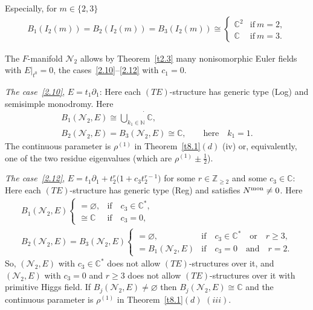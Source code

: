 \documentclass[pdftex]{sigma}%
\numberwithin{equation}{section}
\numberwithin{figure}{section}
\newcommand{\N}{{\mathbb N}}
\newcommand{\Z}{{\mathbb Z}}
\newcommand{\C}{{\mathbb C}}
\newcommand{\NN}{{\mathcal N}}
\newcommand{\paa}{\partial}
\begin{document}
\begin{Remarks}
\begin{enumerate}
Especially, for $m\in\{2,3\}$
\begin{gather*}%
B_1(I_2(m))=B_2(I_2(m))=B_3(I_2(m))\cong
\begin{cases} \C^2&\text{if}\ m=2,\\
\C&\text{if}\ m=3.\end{cases}
\end{gather*}

The $F$-manifold $\NN_2$ allows by Theorem~\ref{t2.3}
many nonisomorphic Euler fields with $E|_{t^0}=0$, the
cases~\eqref{2.10}--\eqref{2.12} with $c_1=0$.

{\it The case~\eqref{2.10}}, $E=t_1\paa_1$:
Here each $(TE)$-structure has generic type (Log)
and semisimple monodromy. Here
\begin{gather*}%
B_1(\NN_2,E)\cong \dot{\bigcup\limits_{k_1\in\N}}\C,
\\
B_2(\NN_2,E)= B_3(\NN_2,E) \cong \C,\qquad
\text{here}\quad k_1=1.\nonumber
\end{gather*}
The continuous parameter is $\rho^{(1)}$ in Theorem~\ref{t8.1}$(d)$ (iv) or, equivalently, one of the
two residue eigenvalues \big(which are $\rho^{(1)}\pm\frac{1}{2}$\big).


{\it The case~\eqref{2.12}},
$E=t_1\paa_1+t_2^r\big(1+c_3t_2^{r-1}\big)$
for some $r\in\Z_{\geq 2}$ and some $c_3\in\C$:
Here each $(TE)$-structure has generic type (Reg) and
satisfies $N^{\rm mon}\neq 0$. Here
\begin{gather*}%
B_1(\NN_2,E) \begin{cases}
=\varnothing,& \text{if}\quad c_3\in\C^*,\\
\cong \C&\text{if}\quad c_3=0,\end{cases}
\\
B_2(\NN_2,E)=B_3(\NN_2,E) \begin{cases}
=\varnothing,& \text{if}\quad c_3\in\C^*\quad \text{or}\quad r\geq 3,\\
=B_1(\NN_2,E)&\text{if}\quad c_3=0\quad \text{and}\quad r=2.
\end{cases}
\end{gather*}
So, $(\NN_2,E)$ with $c_3\in\C^*$ does not allow
$(TE)$-structures over it, and $(\NN_2,E)$ with
$c_3=0$ and $r\geq 3$ does not allow $(TE)$-structures
over it with primitive Higgs field.
If $B_j(\NN_2,E)\allowbreak\neq\varnothing$ then $B_j(\NN_2,E)\cong\C$
and the continuous parameter is $\rho^{(1)}$ in
Theorem~\ref{t8.1}$(d)$ $(iii)$.


\end{enumerate}
\end{Remarks}
\end{document}
